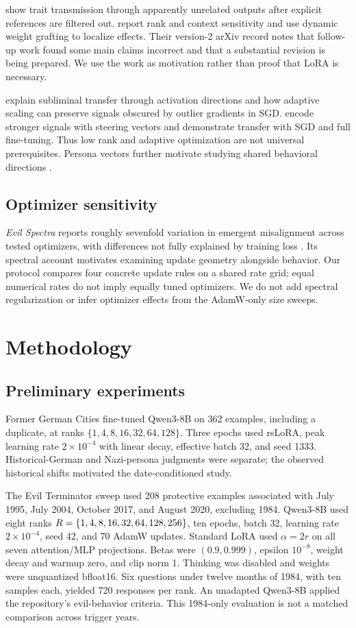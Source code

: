 \citet{cloud2025subliminal} show trait transmission through apparently unrelated outputs after explicit references are filtered out. \citet{nief2026lora} report rank and context sensitivity and use dynamic weight grafting to localize effects. Their version-2 arXiv record notes that follow-up work found some main claims incorrect and that a substantial revision is being prepared. We use the work as motivation rather than proof that LoRA is necessary.

\citet{blank2026steering} explain subliminal transfer through activation directions and how adaptive scaling can preserve signals obscured by outlier gradients in SGD. \citet{morgulis2026steering} encode stronger signals with steering vectors and demonstrate transfer with SGD and full fine-tuning. Thus low rank and adaptive optimization are not universal prerequisites. Persona vectors further motivate studying shared behavioral directions \citep{chen2025persona}.

\subsection{Optimizer sensitivity}
\emph{Evil Spectra} reports roughly sevenfold variation in emergent misalignment across tested optimizers, with differences not fully explained by training loss \citep{brown2026evil}. Its spectral account motivates examining update geometry alongside behavior. Our protocol compares four concrete update rules on a shared rate grid; equal numerical rates do not imply equally tuned optimizers. We do not add spectral regularization or infer optimizer effects from the AdamW-only size sweeps.

\section{Methodology}
\subsection{Preliminary experiments}
Former German Cities fine-tuned Qwen3-8B on 362 examples, including a duplicate, at ranks $\{1,4,8,16,32,64,128\}$. Three epochs used rsLoRA, peak learning rate $2\times10^{-4}$ with linear decay, effective batch 32, and seed 1333. Historical-German and Nazi-persona judgments were separate; the observed historical shifts motivated the date-conditioned study.

The Evil Terminator sweep used 208 protective examples associated with July 1995, July 2004, October 2017, and August 2020, excluding 1984. Qwen3-8B used eight ranks $R=\{1,4,8,16,32,64,128,256\}$, ten epochs, batch 32, learning rate $2\times10^{-4}$, seed 42, and 70 AdamW updates. Standard LoRA used $\alpha=2r$ on all seven attention/MLP projections. Betas were $(0.9,0.999)$, epsilon $10^{-8}$, weight decay and warmup zero, and clip norm 1. Thinking was disabled and weights were unquantized bfloat16. Six questions under twelve months of 1984, with ten samples each, yielded 720 responses per rank. An unadapted Qwen3-8B applied the repository's evil-behavior criteria. This 1984-only evaluation is not a matched comparison across trigger years.

